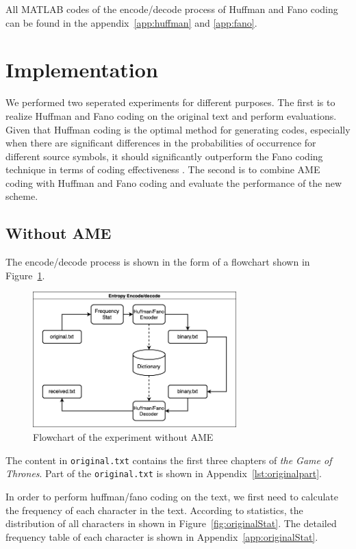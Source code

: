 \documentclass[12pt,twoside]{article}
\begin{document}
All MATLAB codes of the encode/decode process of Huffman and Fano coding can be found in the appendix~\ref{app:huffman} and \ref{app:fano}.

\section{Implementation}

We performed two seperated experiments for different purposes. The first is to realize Huffman and Fano coding on the original text and perform evaluations. Given that Huffman coding is the optimal method for generating codes, especially when there are significant differences in the probabilities of occurrence for different source symbols, it should significantly outperform the Fano coding technique in terms of coding effectiveness \cite{ref3, ref4}. The second is to combine AME coding with Huffman and Fano coding and evaluate the performance of the new scheme.

\subsection{Without AME}

The encode/decode process is shown in the form of a flowchart shown in Figure~\ref{fig:without-ame}.

\begin{figure}[h!]
    \centering
    \includegraphics[width=0.7\textwidth]{without-ame.png}
    \caption{Flowchart of the experiment without AME}
    \label{fig:without-ame}
\end{figure}

The content in \texttt{original.txt} contains the first three chapters of \textit{the Game of Thrones}. Part of the \texttt{original.txt} is shown in Appendix~\ref{lst:originalpart}.

In order to perform huffman/fano coding on the text, we first need to calculate the frequency of each character in the text. According to statistics, the distribution of all characters in shown in Figure~\ref{fig:originalStat}. The detailed frequency table of each character is shown in Appendix~\ref{app:originalStat}.
\end{document}
